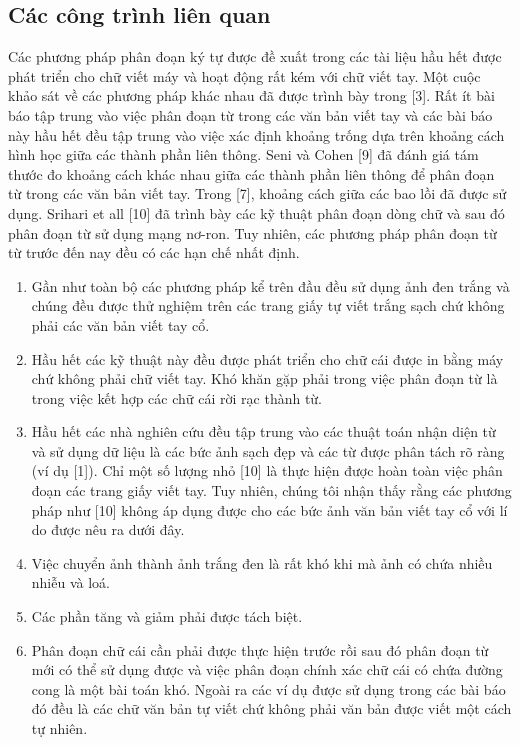 \documentclass[a4paper]{article}
\begin{document}
\subsection{Các công trình liên quan}
Các phương pháp phân đoạn ký tự được đề xuất trong các tài liệu hầu hết được phát triển cho chữ viết máy và hoạt động rất kém với chữ viết tay. Một cuộc khảo sát về các phương pháp khác nhau đã được trình bày trong [3]. Rất ít bài báo tập trung vào việc phân đoạn từ trong các văn bản viết tay và các bài báo này hầu hết đều tập trung vào việc xác định khoảng trống dựa trên khoảng cách hình học giữa các thành phần liên thông. Seni và Cohen [9] đã đánh giá tám thước đo khoảng cách khác nhau giữa các thành phần liên thông để phân đoạn từ trong các văn bản viết tay. Trong [7], khoảng cách giữa các bao lồi đã được sử dụng. Srihari et all [10] đã trình bày các kỹ thuật phân đoạn dòng chữ và sau đó phân đoạn từ sử dụng mạng nơ-ron. Tuy nhiên, các phương pháp phân đoạn từ từ trước đến nay đều có các hạn chế nhất định.
\begin{enumerate}
    \item Gần như toàn bộ các phương pháp kể trên đầu đều sử dụng ảnh đen trắng và chúng đều được thử nghiệm trên các trang giấy tự viết trắng sạch chứ không phải các văn bản viết tay cổ.
    \item Hầu hết các kỹ thuật này đều được phát triển cho chữ cái được in bằng máy chứ không phải chữ viết tay. Khó khăn gặp phải trong việc phân đoạn từ là trong việc kết hợp các chữ cái rời rạc thành từ.
    \item Hầu hết các nhà nghiên cứu đều tập trung vào các thuật toán nhận diện từ và sử dụng dữ liệu là các bức ảnh sạch đẹp và các từ được phân tách rõ ràng (ví dụ [1]). Chỉ một số lượng nhỏ [10] là thực hiện được hoàn toàn việc phân đoạn các trang giấy viết tay. Tuy nhiên, chúng tôi nhận thấy rằng các phương pháp như [10] không áp dụng được cho các bức ảnh văn bản viết tay cổ với lí do được nêu ra dưới đây.
    \item Việc chuyển ảnh thành ảnh trắng đen là rất khó khi mà ảnh có chứa nhiều nhiễu và loá.
    \item Các phần tăng và giảm phải được tách biệt.
    \item Phân đoạn chữ cái cần phải được thực hiện trước rồi sau đó phân đoạn từ mới có thể sử dụng được và việc phân đoạn chính xác chữ cái có chứa đường cong là một bài toán khó. Ngoài ra các ví dụ được sử dụng trong các bài báo đó đều là các chữ văn bản tự viết chứ không phải văn bản được viết một cách tự nhiên.
\end{enumerate}
\end{document}
